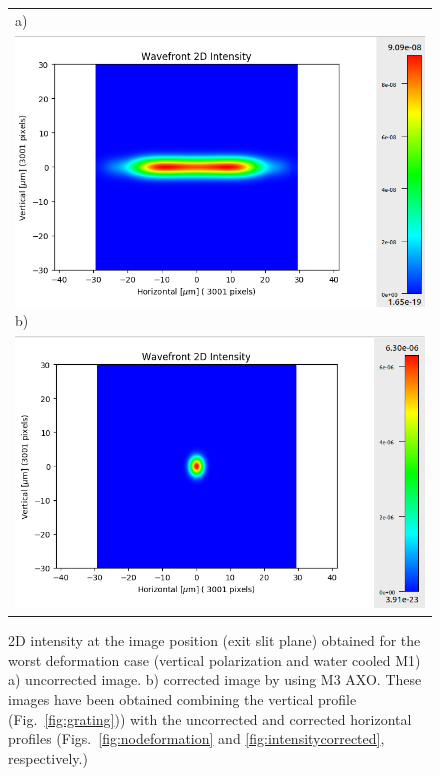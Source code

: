 \documentclass{iucr}              %
\begin{document}
  \begin{figure}
  \begin{center}
  \begin{tabular}{l} 
  a)\\
  \includegraphics[width=1\textwidth]{figures/intensity2Duncorrected.png}
  b)\\
  \includegraphics[width=1\textwidth]{figures/intensity2Dcorrected.png}

  \end{tabular}
  \end{center}
  \caption
  { \label{fig:intensity2D} 
2D intensity at the image position (exit slit plane) obtained for the worst deformation case (vertical polarization and water cooled M1) a) uncorrected image. b) corrected image by using M3 AXO. These images have been obtained combining the vertical profile (Fig.~\ref{fig:grating})) with the uncorrected and corrected horizontal profiles (Figs.~\ref{fig:nodeformation} and \ref{fig:intensitycorrected}, respectively.)
}
  \end{figure}
  
\end{document}
